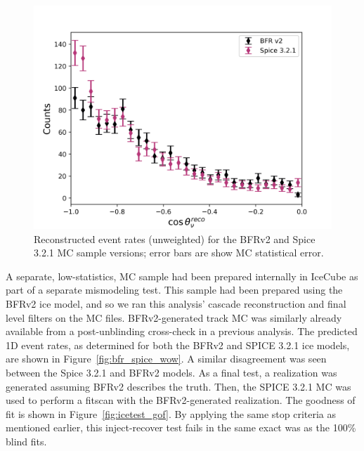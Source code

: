 \documentclass[main.tex]{subfiles}
\begin{document}
\begin{figure}
    \centering
    \includegraphics[width=0.8\linewidth]{figures/ice_investigate/icetest.png}
    \caption{Reconstructed event rates (unweighted) for the BFRv2 and Spice 3.2.1 MC sample versions; error bars are show MC statistical error.}\label{fig:icetest}
\end{figure}

A separate, low-statistics, MC sample had been prepared internally in IceCube as part of a separate mismodeling test. 
This sample had been prepared using the BFRv2 ice model, and so we ran this analysis' cascade reconstruction and final level filters on the MC files. 
BFRv2-generated track MC was similarly already available from a post-unblinding cross-check in a previous analysis.
The predicted 1D event rates, as determined for both the BFRv2 and SPICE 3.2.1 ice models, are shown in Figure~\ref{fig:bfr_spice_wow}. 
A similar disagreement was seen between the Spice 3.2.1 and BFRv2 models.
As a final test, a realization was generated assuming BFRv2 describes the truth.
Then, the SPICE 3.2.1 MC was used to perform a fitscan with the BFRv2-generated realization. 
The goodness of fit is shown in Figure~\ref{fig:icetest_gof}.
By applying the same stop criteria as mentioned earlier, this inject-recover test fails in the same exact was as the 100\% blind fits. 
\end{document}
